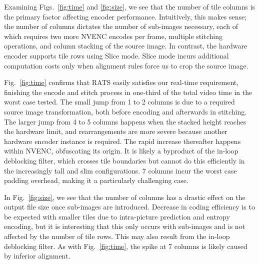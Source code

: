 Examining Figs.~\ref{fig:time} and \ref{fig:size}, we see that the number of tile columns is the primary factor affecting encoder performance. Intuitively, this makes sense; the number of columns dictates the number of sub-images necessary, each of which requires two more NVENC encodes per frame, multiple stitching operations, and column stacking of the source image. In contrast, the hardware encoder supports tile rows using Slice mode. Slice mode incurs additional computation costs only when alignment rules force us to crop the source image.

Fig.~\ref{fig:time} confirms that RATS easily satisfies our real-time requirement, finishing the encode and stitch process in one-third of the total video time in the worst case tested.
The small jump from 1 to 2 columns is due to a required source image transformation, both before encoding and afterwards in stitching.
The larger jump from 4 to 5 columns happens when the stacked height reaches the hardware limit, and rearrangements are more severe because another hardware encoder instance is required.
The rapid increase thereafter happens within NVENC, obfuscating its origin.
It is likely a byproduct of the in-loop deblocking filter, which crosses tile boundaries but cannot do this efficiently in the increasingly tall and slim configurations. 7 columns incur the worst case padding overhead, making it a particularly challenging case.


In Fig.~\ref{fig:size}, we see that the number of columns has a drastic effect on the output file size once sub-images are introduced. Decrease in coding efficiency is to be expected with smaller tiles due to intra-picture prediction and entropy encoding, but it is interesting that this only occurs with sub-images and is not affected by the number of tile rows.
This may also result from the in-loop deblocking filter.
As with Fig.~\ref{fig:time}, the spike at 7 columns is likely caused by inferior alignment.


